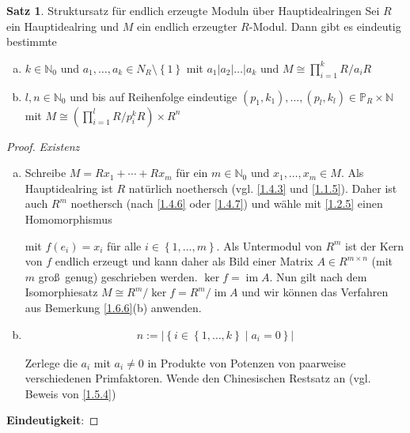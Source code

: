 \documentclass[
twoside=semi,
fontsize=12,
DIV=12, 
cleardoublepage=current,
leqno,
headings=optiontoheadandtoc, 
toc=idx
]{scrbook}
\newcommand{\N}{\mathbb{N}}
\renewcommand{\P}{\mathbb{P}}
\newcommand{\brac}[1]{\left( #1 \right)}
\newcommand{\set}[1]{\left\{ #1 \right\}}
\DeclareMathOperator{\im}{im}
\theoremstyle{definition}
\newtheorem{satz}[definition]{Satz}
\begin{document}
	\begin{satz}\label{1.6.9} Struktursatz f\"ur endlich erzeugte Moduln \"uber Hauptidealringen\newline
		Sei $R$ ein Hauptidealring und $M$ ein endlich erzeugter $R$-Modul. Dann gibt es eindeutig bestimmte
		
		\begin{enumerate}[(a)]
			\item 
			$k\in \N_0$ und $a_1, \dots, a_k \in N_R\setminus \set{1}$ mit $a_1|a_2|\dots|a_k$ und $M\cong \prod_{i=1}^kR/a_iR$
 			
			\item $l, n\in \N_0$ und bis auf Reihenfolge eindeutige $(p_1, k_1), \dots, (p_l, k_l) \in \P_R \times \N$ mit $M \cong \brac{\prod_{i=1}^l R/p_i^kR} \times R^n$
		\end{enumerate}
	
		\begin{proof}
			\emph{Existenz}
			\begin{enumerate}[(a)]
				\item 
				Schreibe $M = Rx_1 + \cdots + Rx_m$ f\"ur ein $m \in \N_0$ und $x_1, \dots, x_m \in M$. Als Hauptidealring ist $R$ nat\"urlich noethersch (vgl. \ref{1.4.3} und \ref{1.1.5}). Daher ist auch $R^m$ noethersch (nach \ref{1.4.6} oder \ref{1.4.7}) und w\"ahle mit \ref{1.2.5} einen Homomorphismus  mit $f(e_i) = x_i$ f\"ur alle $i \in \set{1, \dots, m}$. Als Untermodul von $R^m$ ist der Kern von $f$ endlich erzeugt und kann daher als Bild einer Matrix $A\in R^{m\times n}$ (mit $m$ gro\ss\ genug) geschrieben werden. $\ker f = \im A$. Nun gilt nach dem Isomorphiesatz $M \cong R^m/\ker f = R^m / \im A$ und wir k\"onnen das Verfahren aus Bemerkung \ref{1.6.6}(b) anwenden.
				
				\item 
				\begin{align}
					n:= |\set{i \in \set{1, \dots, k} \mid a_i = 0}| \label{1.6.9.1}\tag{$*$}
				\end{align}
				
				Zerlege die $a_i$ mit $a_i \neq 0$ in Produkte von Potenzen von paarweise verschiedenen Primfaktoren. Wende den Chinesischen Restsatz an (vgl. Beweis von \ref{1.5.4})
			\end{enumerate}
			
			\medskip\noindent\textbf{Eindeutigkeit}:
			

\end{proof}
\end{satz}
\end{document}
